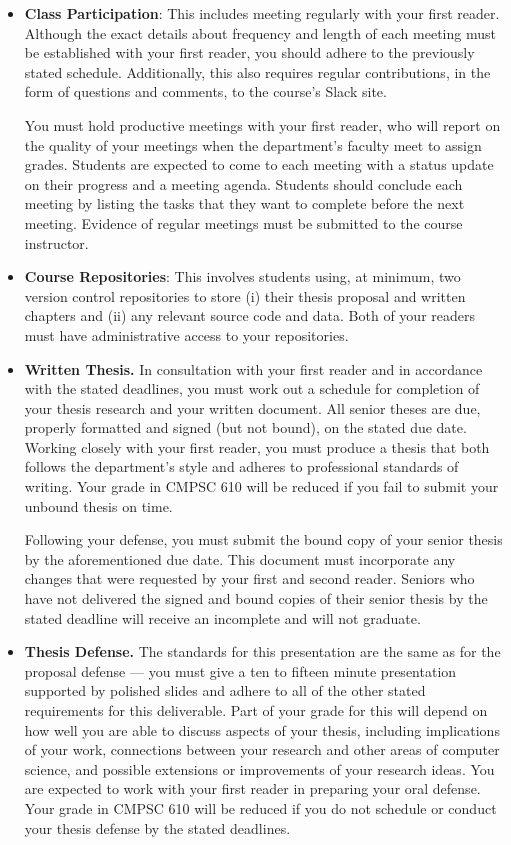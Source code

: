 \begin{itemize}
  \itemsep -.25em

  \item {\bf Class Participation}: This includes meeting regularly with your first reader. Although the exact details
    about frequency and length of each meeting must be established with your first reader, you should adhere to the
    previously stated schedule. Additionally, this also requires regular contributions, in the form of questions and
    comments, to the course's Slack site.

  You must hold productive meetings with your first reader, who will report on the quality of your meetings when the
  department's faculty meet to assign grades.  Students are expected to come to each meeting with a status update on
  their progress and a meeting agenda.  Students should conclude each meeting by listing the tasks that they want to
  complete before the next meeting. Evidence of regular meetings must be submitted to the course instructor.

  \item {\bf Course Repositories}: This involves students using, at minimum, two version control repositories to
    store (i) their thesis proposal and written chapters and (ii) any relevant source code and data.  Both of your
    readers must have administrative access to your repositories.


  \item {\bf Written Thesis.} In consultation with your first reader and in accordance with the stated deadlines, you
    must work out a schedule for completion of your thesis research and your written document. All senior theses are
    due, properly formatted and signed (but not bound), on the stated due date.  Working closely with your first reader,
    you must produce a thesis that both follows the department's style and adheres to professional standards of writing.
    Your grade in CMPSC 610 will be reduced if you fail to submit your unbound thesis on time.

    Following your defense, you must submit the bound copy of your senior thesis by the aforementioned due date.  This
    document must incorporate any changes that were requested by your first and second reader. Seniors who have not
    delivered the signed and bound copies of their senior thesis by the stated deadline will receive an
    incomplete and will not graduate.

  \item{\bf Thesis Defense.} The standards for this presentation are the same as for the proposal defense --- you must
    give a ten to fifteen minute presentation supported by polished slides and adhere to all of the other stated
    requirements for this deliverable.  Part of your grade for this will depend on how well you are able to discuss
    aspects of your thesis, including implications of your work, connections between your research and other areas of
    computer science, and possible extensions or improvements of your research ideas.  You are expected to work with
    your first reader in preparing your oral defense.  Your grade in CMPSC 610 will be reduced if you do not schedule or
    conduct your thesis defense by the stated deadlines.


\end{itemize}
